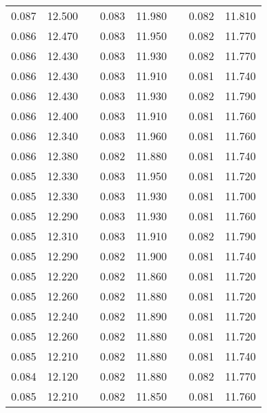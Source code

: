 \documentclass[12pt]{mwrep}
\begin{document}
\begin{table}[H]
\begin{tabularx}{\textwidth}{|Y|Y|p{2mm}|Y|Y|p{2mm}|Y|Y|}
			0.087 & 12.500 && 0.083 & 11.980 && 0.082 & 11.810 \\
			0.086 & 12.470 && 0.083 & 11.950 && 0.082 & 11.770 \\
			0.086 & 12.430 && 0.083 & 11.930 && 0.082 & 11.770 \\
			0.086 & 12.430 && 0.083 & 11.910 && 0.081 & 11.740 \\
			0.086 & 12.430 && 0.083 & 11.930 && 0.082 & 11.790 \\
			0.086 & 12.400 && 0.083 & 11.910 && 0.081 & 11.760 \\
			0.086 & 12.340 && 0.083 & 11.960 && 0.081 & 11.760 \\
			0.086 & 12.380 && 0.082 & 11.880 && 0.081 & 11.740 \\
			0.085 & 12.330 && 0.083 & 11.950 && 0.081 & 11.720 \\
			0.085 & 12.330 && 0.083 & 11.930 && 0.081 & 11.700 \\
			0.085 & 12.290 && 0.083 & 11.930 && 0.081 & 11.760 \\
			0.085 & 12.310 && 0.083 & 11.910 && 0.082 & 11.790 \\
			0.085 & 12.290 && 0.082 & 11.900 && 0.081 & 11.740 \\
			0.085 & 12.220 && 0.082 & 11.860 && 0.081 & 11.720 \\
			0.085 & 12.260 && 0.082 & 11.880 && 0.081 & 11.720 \\
			0.085 & 12.240 && 0.082 & 11.890 && 0.081 & 11.720 \\
			0.085 & 12.260 && 0.082 & 11.880 && 0.081 & 11.720 \\
			0.085 & 12.210 && 0.082 & 11.880 && 0.081 & 11.740 \\
			0.084 & 12.120 && 0.082 & 11.880 && 0.082 & 11.770 \\
			0.085 & 12.210 && 0.082 & 11.850 && 0.081 & 11.760 \\

\end{tabularx}
\end{table}
\end{document}
